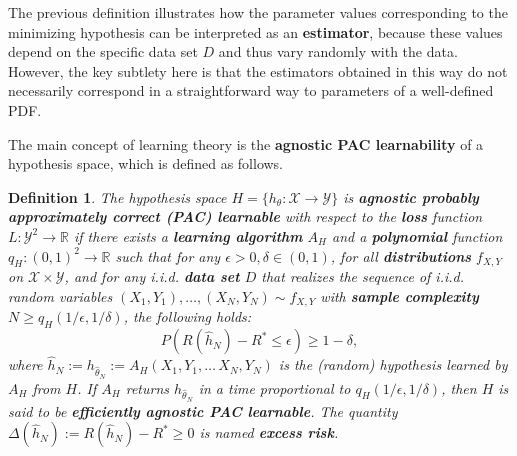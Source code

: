 \documentclass{report}
\newtheorem{definition}{Definition}[chapter]
\begin{document}
The previous definition illustrates how the parameter values corresponding to the minimizing hypothesis can be interpreted as an \textbf{estimator}, because these values depend on the specific data set $D$ and thus vary randomly with the data. However, the key subtlety here is that the estimators obtained in this way do not necessarily correspond in a straightforward way to parameters of a well-defined PDF.

The main concept of learning theory is the \textbf{agnostic PAC learnability} of a hypothesis space, which is defined as follows.

\begin{definition}
The hypothesis space $H = \{h_\theta : \mathcal{X} \to \mathcal{Y}\}$ is \textbf{agnostic probably approximately correct (PAC) learnable} with respect to the \textbf{loss} function $L : \mathcal{Y}^2 \to \mathbb{R}$ if there exists a \textbf{learning algorithm} $A_H$ and a \textbf{polynomial} function $q_H : (0,1) ^2 \to \mathbb{R}$ such that for any $\epsilon > 0,\delta \in (0,1)$, for all \textbf{distributions} $f_{X,Y}$ on $\mathcal{X} \times \mathcal{Y}$, and for any i.i.d. \textbf{data set} $D$ that realizes the sequence of i.i.d. random variables $(X_1, Y_1),\dots,(X_N, Y_N)\sim f_{X,Y}$ with \textbf{sample complexity} $N\geq q_H(1/\epsilon,1/\delta)$, the following holds:
\begin{equation}
P(R(\hat{h}_N) - R^* \leq \epsilon) \geq 1- \delta,
\end{equation}
where $\hat{h}_N := h_{\hat{\theta}_N} := A_H(X_1, Y_1,\dots\,X_N, Y_N)$ is the (random) hypothesis learned by $A_H$ from $H$. If $A_H$ returns $h_{\hat{\theta}_N}$ in a time proportional to $q_H(1/\epsilon,1/\delta)$, then $H$ is said to be \textbf{efficiently agnostic PAC
learnable}. The quantity $\Delta(\hat{h}_N) := R(\hat{h}_N) - R^* \geq 0$ is named \textbf{excess risk}.
\end{definition}
\end{document}
